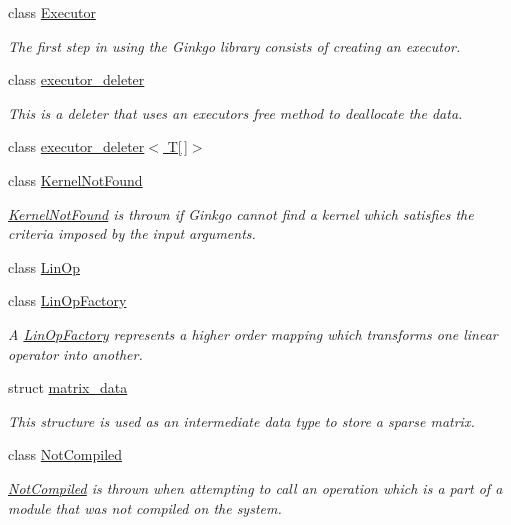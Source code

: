 \begin{DoxyCompactItemize}
class \hyperlink{classgko_1_1Executor}{Executor}
\begin{DoxyCompactList}\small\item\em The first step in using the Ginkgo library consists of creating an executor. \end{DoxyCompactList}\item 
class \hyperlink{classgko_1_1executor__deleter}{executor\+\_\+deleter}
\begin{DoxyCompactList}\small\item\em This is a deleter that uses an executor\textquotesingle{}s {\ttfamily free} method to deallocate the data. \end{DoxyCompactList}\item 
class \hyperlink{classgko_1_1executor__deleter_3_01T[]_4}{executor\+\_\+deleter$<$ T\mbox{[}$\,$\mbox{]}$>$}
\item 
class \hyperlink{classgko_1_1KernelNotFound}{Kernel\+Not\+Found}
\begin{DoxyCompactList}\small\item\em \hyperlink{classgko_1_1KernelNotFound}{Kernel\+Not\+Found} is thrown if Ginkgo cannot find a kernel which satisfies the criteria imposed by the input arguments. \end{DoxyCompactList}\item 
class \hyperlink{classgko_1_1LinOp}{Lin\+Op}
\item 
class \hyperlink{classgko_1_1LinOpFactory}{Lin\+Op\+Factory}
\begin{DoxyCompactList}\small\item\em A \hyperlink{classgko_1_1LinOpFactory}{Lin\+Op\+Factory} represents a higher order mapping which transforms one linear operator into another. \end{DoxyCompactList}\item 
struct \hyperlink{structgko_1_1matrix__data}{matrix\+\_\+data}
\begin{DoxyCompactList}\small\item\em This structure is used as an intermediate data type to store a sparse matrix. \end{DoxyCompactList}\item 
class \hyperlink{classgko_1_1NotCompiled}{Not\+Compiled}
\begin{DoxyCompactList}\small\item\em \hyperlink{classgko_1_1NotCompiled}{Not\+Compiled} is thrown when attempting to call an operation which is a part of a module that was not compiled on the system. \end{DoxyCompactList}\item 

\end{DoxyCompactItemize}
